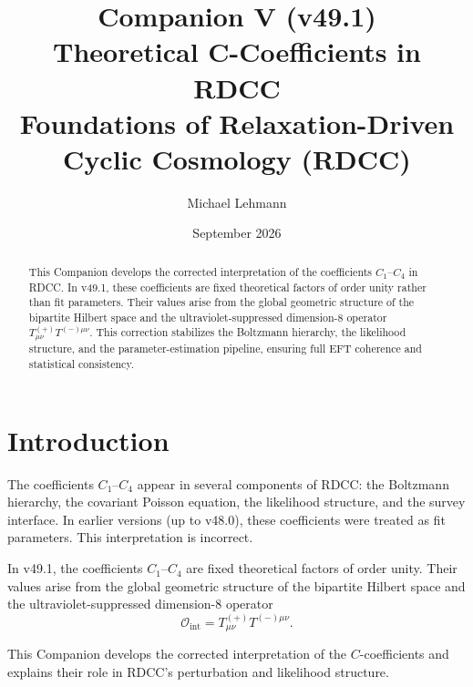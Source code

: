 \documentclass[11pt,a4paper]{article}
\title{\textbf{Companion V (v49.1)}\\[0.2cm]
\textbf{Theoretical C-Coefficients in RDCC}\\[0.2cm]
\large Foundations of Relaxation-Driven Cyclic Cosmology (RDCC)}
\author[1]{Michael Lehmann}
\affil[1]{\small Independent Researcher, Relaxation-Driven Cyclic Cosmology (RDCC)\\
\texttt{mi.lehmann@gmx.de}}
\date{September 2026}
\begin{document}
\maketitle


\begin{abstract}
This Companion develops the corrected interpretation of the coefficients
$C_1$–$C_4$ in RDCC. In v49.1, these coefficients are fixed theoretical factors
of order unity rather than fit parameters. Their values arise from the global
geometric structure of the bipartite Hilbert space and the ultraviolet-suppressed
dimension-8 operator $T^{(+)}_{\mu\nu}T^{(-)\mu\nu}$. This correction stabilizes
the Boltzmann hierarchy, the likelihood structure, and the parameter-estimation
pipeline, ensuring full EFT coherence and statistical consistency.
\end{abstract}

\tableofcontents
\newpage

\section{Introduction}

The coefficients $C_1$–$C_4$ appear in several components of RDCC: the
Boltzmann hierarchy, the covariant Poisson equation, the likelihood structure,
and the survey interface. In earlier versions (up to v48.0), these coefficients
were treated as fit parameters. This interpretation is incorrect.

In v49.1, the coefficients $C_1$–$C_4$ are fixed theoretical factors of order
unity. Their values arise from the global geometric structure of the bipartite
Hilbert space and the ultraviolet-suppressed dimension-8 operator
\begin{equation}
\mathcal{O}_{\mathrm{int}} = T^{(+)}_{\mu\nu} T^{(-)\mu\nu}.
\end{equation}

This Companion develops the corrected interpretation of the $C$-coefficients
and explains their role in RDCC’s perturbation and likelihood structure.
\end{document}
